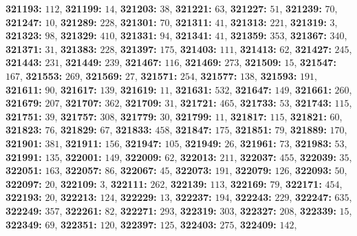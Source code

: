\textsf{\bfseries 321193:} $112$, \textsf{\bfseries 321199:} $14$, \textsf{\bfseries 321203:} $38$, \textsf{\bfseries 321221:} $63$, \textsf{\bfseries 321227:} $51$, \textsf{\bfseries 321239:} $70$, \textsf{\bfseries 321247:} $10$, \textsf{\bfseries 321289:} $228$, \textsf{\bfseries 321301:} $70$, \textsf{\bfseries 321311:} $41$, \textsf{\bfseries 321313:} $221$, \textsf{\bfseries 321319:} $3$, \textsf{\bfseries 321323:} $98$, \textsf{\bfseries 321329:} $410$, \textsf{\bfseries 321331:} $94$, \textsf{\bfseries 321341:} $41$, \textsf{\bfseries 321359:} $353$, \textsf{\bfseries 321367:} $340$, \textsf{\bfseries 321371:} $31$, \textsf{\bfseries 321383:} $228$, \textsf{\bfseries 321397:} $175$, \textsf{\bfseries 321403:} $111$, \textsf{\bfseries 321413:} $62$, \textsf{\bfseries 321427:} $245$, \textsf{\bfseries 321443:} $231$, \textsf{\bfseries 321449:} $239$, \textsf{\bfseries 321467:} $116$, \textsf{\bfseries 321469:} $273$, \textsf{\bfseries 321509:} $15$, \textsf{\bfseries 321547:} $167$, \textsf{\bfseries 321553:} $269$, \textsf{\bfseries 321569:} $27$, \textsf{\bfseries 321571:} $254$, \textsf{\bfseries 321577:} $138$, \textsf{\bfseries 321593:} $191$, \textsf{\bfseries 321611:} $90$, \textsf{\bfseries 321617:} $139$, \textsf{\bfseries 321619:} $11$, \textsf{\bfseries 321631:} $532$, \textsf{\bfseries 321647:} $149$, \textsf{\bfseries 321661:} $260$, \textsf{\bfseries 321679:} $207$, \textsf{\bfseries 321707:} $362$, \textsf{\bfseries 321709:} $31$, \textsf{\bfseries 321721:} $465$, \textsf{\bfseries 321733:} $53$, \textsf{\bfseries 321743:} $115$, \textsf{\bfseries 321751:} $39$, \textsf{\bfseries 321757:} $308$, \textsf{\bfseries 321779:} $30$, \textsf{\bfseries 321799:} $11$, \textsf{\bfseries 321817:} $115$, \textsf{\bfseries 321821:} $60$, \textsf{\bfseries 321823:} $76$, \textsf{\bfseries 321829:} $67$, \textsf{\bfseries 321833:} $458$, \textsf{\bfseries 321847:} $175$, \textsf{\bfseries 321851:} $79$, \textsf{\bfseries 321889:} $170$, \textsf{\bfseries 321901:} $381$, \textsf{\bfseries 321911:} $156$, \textsf{\bfseries 321947:} $105$, \textsf{\bfseries 321949:} $26$, \textsf{\bfseries 321961:} $73$, \textsf{\bfseries 321983:} $53$, \textsf{\bfseries 321991:} $135$, \textsf{\bfseries 322001:} $149$, \textsf{\bfseries 322009:} $62$, \textsf{\bfseries 322013:} $211$, \textsf{\bfseries 322037:} $455$, \textsf{\bfseries 322039:} $35$, \textsf{\bfseries 322051:} $163$, \textsf{\bfseries 322057:} $86$, \textsf{\bfseries 322067:} $45$, \textsf{\bfseries 322073:} $191$, \textsf{\bfseries 322079:} $126$, \textsf{\bfseries 322093:} $50$, \textsf{\bfseries 322097:} $20$, \textsf{\bfseries 322109:} $3$, \textsf{\bfseries 322111:} $262$, \textsf{\bfseries 322139:} $113$, \textsf{\bfseries 322169:} $79$, \textsf{\bfseries 322171:} $454$, \textsf{\bfseries 322193:} $20$, \textsf{\bfseries 322213:} $124$, \textsf{\bfseries 322229:} $13$, \textsf{\bfseries 322237:} $194$, \textsf{\bfseries 322243:} $229$, \textsf{\bfseries 322247:} $635$, \textsf{\bfseries 322249:} $357$, \textsf{\bfseries 322261:} $82$, \textsf{\bfseries 322271:} $293$, \textsf{\bfseries 322319:} $303$, \textsf{\bfseries 322327:} $208$, \textsf{\bfseries 322339:} $15$, \textsf{\bfseries 322349:} $69$, \textsf{\bfseries 322351:} $120$, \textsf{\bfseries 322397:} $125$, \textsf{\bfseries 322403:} $275$, \textsf{\bfseries 322409:} $142$, 
